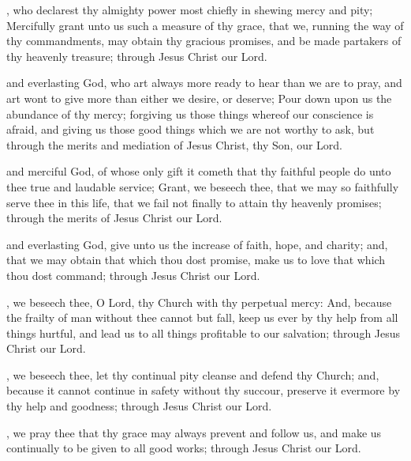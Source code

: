 , who declarest thy almighty power most chiefly in shewing mercy and pity; Mercifully grant unto us such a measure of thy grace, that we, running the way of thy commandments, may obtain thy gracious promises, and be made partakers of thy heavenly treasure; through Jesus Christ our Lord.

 and everlasting God, who art always more ready to hear than we are to pray, and art wont to give more than either we desire, or deserve; Pour down upon us the abundance of thy mercy; forgiving us those things whereof our conscience is afraid, and giving us those good things which we are not worthy to ask, but through the merits and mediation of Jesus Christ, thy Son, our Lord.

 and merciful God, of whose only gift it cometh that thy faithful people do unto thee true and laudable service; Grant, we beseech thee, that we may so faithfully serve thee in this life, that we fail not finally to attain thy heavenly promises; through the merits of Jesus Christ our Lord.

 and everlasting God, give unto us the increase of faith, hope, and charity; and, that we may obtain that which thou dost promise, make us to love that which thou dost command; through Jesus Christ our Lord.

, we beseech thee, O Lord, thy Church with thy perpetual mercy: And, because the frailty of man without thee cannot but fall, keep us ever by thy help from all things hurtful, and lead us to all things profitable to our salvation; through Jesus Christ our Lord.

, we beseech thee, let thy continual pity cleanse and defend thy Church; and, because it cannot continue in safety without thy succour, preserve it evermore by thy help and goodness; through Jesus Christ our Lord.

, we pray thee that thy grace may always prevent and follow us, and make us continually to be given to all good works; through Jesus Christ our Lord.

